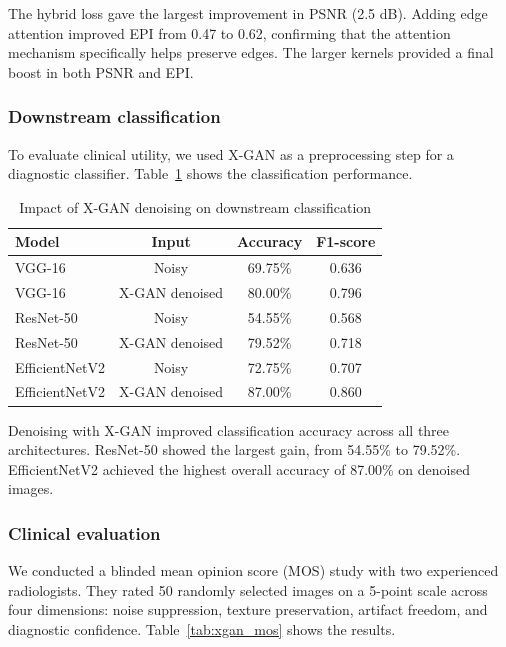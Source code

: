The hybrid loss gave the largest improvement in PSNR (2.5 dB). Adding edge attention improved EPI from 0.47 to 0.62, confirming that the attention mechanism specifically helps preserve edges. The larger kernels provided a final boost in both PSNR and EPI.

\subsubsection{Downstream classification}

To evaluate clinical utility, we used X-GAN as a preprocessing step for a diagnostic classifier. Table~\ref{tab:xgan_downstream} shows the classification performance.

\begin{table}[H]
	\centering
	\caption{Impact of X-GAN denoising on downstream classification}
	\label{tab:xgan_downstream}
	\begin{tabular}{lccc}
		\toprule
		Model & Input & Accuracy & F1-score \\
		\midrule
		VGG-16 & Noisy & 69.75\% & 0.636 \\
		VGG-16 & X-GAN denoised & 80.00\% & 0.796 \\
		ResNet-50 & Noisy & 54.55\% & 0.568 \\
		ResNet-50 & X-GAN denoised & 79.52\% & 0.718 \\
		EfficientNetV2 & Noisy & 72.75\% & 0.707 \\
		EfficientNetV2 & X-GAN denoised & 87.00\% & 0.860 \\
		\bottomrule
	\end{tabular}
\end{table}

Denoising with X-GAN improved classification accuracy across all three architectures. ResNet-50 showed the largest gain, from 54.55\% to 79.52\%. EfficientNetV2 achieved the highest overall accuracy of 87.00\% on denoised images.

\subsubsection{Clinical evaluation}

We conducted a blinded mean opinion score (MOS) study with two experienced radiologists. They rated 50 randomly selected images on a 5-point scale across four dimensions: noise suppression, texture preservation, artifact freedom, and diagnostic confidence. Table~\ref{tab:xgan_mos} shows the results.

